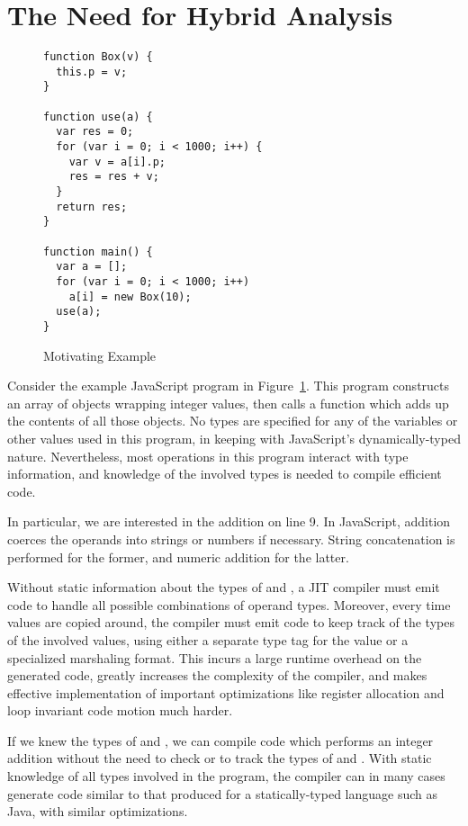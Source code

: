 
\section{The Need for Hybrid Analysis}
\label{sec:example}

\begin{figure}
\begin{lstlisting}[xleftmargin=18pt]
function Box(v) {
  this.p = v;
}

function use(a) {
  var res = 0;
  for (var i = 0; i < 1000; i++) {
    var v = a[i].p;
    res = res + v;
  }
  return res;
}

function main() {
  var a = [];
  for (var i = 0; i < 1000; i++)
    a[i] = new Box(10);
  use(a);
}
\end{lstlisting}
\caption{Motivating Example}
\label{fig:motivating-example}
\end{figure}

Consider the example JavaScript program in Figure~\ref{fig:motivating-example}.
This program constructs an array of  objects wrapping integer
values, then calls a  function which adds up the contents of all
those  objects.
No types are specified for any of the variables or other values used
in this program, in keeping with JavaScript's dynamically-typed nature.
Nevertheless, most operations in this program interact with type information,
and knowledge of the involved types is needed to compile efficient code.

In particular, we are interested in the addition  on line 9.  In
JavaScript, addition coerces the operands into strings or numbers if
necessary. String concatenation is performed for the former, and numeric
addition for the latter.

Without static information about the types of  and ,
a JIT compiler must emit code to handle all possible combinations of
operand types.
Moreover, every time values are copied around, the compiler must emit
code to keep track of the types of the involved values, using either
a separate type tag for the value or a specialized marshaling format.
This incurs a large runtime overhead on the generated code,
greatly increases the complexity of the compiler,
and makes effective implementation of important optimizations like
register allocation and loop invariant code motion much harder.

If we knew the types of  and , we can compile
code which performs an integer addition without the need to check or
to track the types of  and .
With static knowledge of all types involved in the program, the compiler can
in many cases generate code similar to that produced for a statically-typed
 language such as Java, with similar optimizations.


